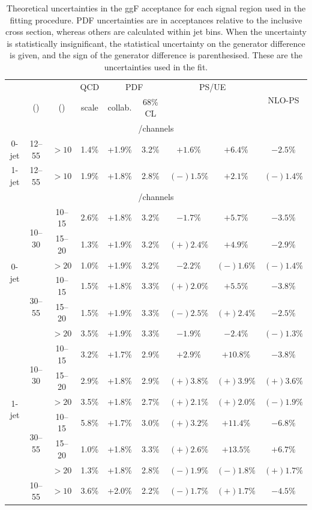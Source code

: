\begin{table}[p]
	\centering
	\begin{tabular}{ccc|cccccc}
		\toprule
		& \mll & \ptsubleadlep & QCD & \multicolumn{2}{c}{PDF} & \multicolumn{2}{c}{PS/UE} & \multirow{2}{*}{NLO-PS} \\
		& (\GeV) & (\GeV) & scale & collab. & 68\% CL & \pythia{6} & \fherwig & \\
		\midrule
		\multicolumn{9}{c}{\eech/\mmch channels} \\
		\midrule
		0-jet & 12--55 & $>10$ & 1.4\% & +1.9\% & 3.2\% &   $+1.6\%$ & $+6.4\%$ &   $-2.5\%$ \\
		1-jet & 12--55 & $>10$ & 1.9\% & +1.8\% & 2.8\% & $(-)1.5\%$ & $+2.1\%$ & $(-)1.4\%$ \\
		\midrule
		\multicolumn{9}{c}{\emch/\mech channels} \\
		\midrule
		\multirow{6}{*}{0-jet}
		& \multirow{3}{*}{10--30}
	    &  10--15 & 2.6\% & +1.8\% & 3.2\% &   $-1.7\%$ &   $+5.7\%$ &   $-3.5\%$ \\
		&& 15--20 & 1.3\% & +1.9\% & 3.2\% & $(+)2.4\%$ &   $+4.9\%$ &   $-2.9\%$ \\
		&&  $>20$ & 1.0\% & +1.9\% & 3.2\% &   $-2.2\%$ & $(-)1.6\%$ & $(-)1.4\%$ \\
		\cmidrule(lr){2-9}
		& \multirow{3}{*}{30--55}
		&  10--15 & 1.5\% & +1.8\% & 3.3\% & $(+)2.0\%$ &   $+5.5\%$ &   $-3.8\%$ \\
		&& 15--20 & 1.5\% & +1.9\% & 3.3\% & $(-)2.5\%$ & $(+)2.4\%$ &   $-2.5\%$ \\
		&&  $>20$ & 3.5\% & +1.9\% & 3.3\% &   $-1.9\%$ &   $-2.4\%$ & $(-)1.3\%$ \\
		\cmidrule(lr){1-9}
		\multirow{6}{*}{1-jet}
		& \multirow{3}{*}{10--30}
	    &  10--15 & 3.2\% & +1.7\% & 2.9\% &   $+2.9\%$ &  $+10.8\%$ &   $-3.8\%$ \\
		&& 15--20 & 2.9\% & +1.8\% & 2.9\% & $(+)3.8\%$ & $(+)3.9\%$ & $(+)3.6\%$ \\
		&&  $>20$ & 3.5\% & +1.8\% & 2.7\% & $(+)2.1\%$ & $(+)2.0\%$ & $(-)1.9\%$ \\
		\cmidrule(lr){2-9}
		& \multirow{3}{*}{30--55}
		&  10--15 & 5.8\% & +1.7\% & 3.0\% & $(+)3.2\%$ &  $+11.4\%$ &   $-6.8\%$ \\
		&& 15--20 & 1.0\% & +1.8\% & 3.3\% & $(+)2.6\%$ &  $+13.5\%$ &   $+6.7\%$ \\
		&&  $>20$ & 1.3\% & +1.8\% & 2.8\% & $(-)1.9\%$ & $(-)1.8\%$ & $(+)1.7\%$ \\
		\cmidrule(lr){1-9}
		\twojet & 10--55 & $>10$ & 3.6\% & +2.0\% & 2.2\% & $(-)1.7\%$ & $(+)1.7\%$ & $-4.5\%$ \\
		\bottomrule
	\end{tabular}
	\caption{Theoretical uncertainties in the ggF acceptance for each signal region used 
	in the fitting procedure. PDF uncertainties are in acceptances relative to the 
	inclusive cross section, whereas others are calculated within jet bins. When the 
	uncertainty is statistically insignificant, the statistical uncertainty on the 
	generator difference is given, and the sign of the generator difference is 
	parenthesised. These are the uncertainties used in the fit.}
	\label{tab:signal:acc_unc}
\end{table}
